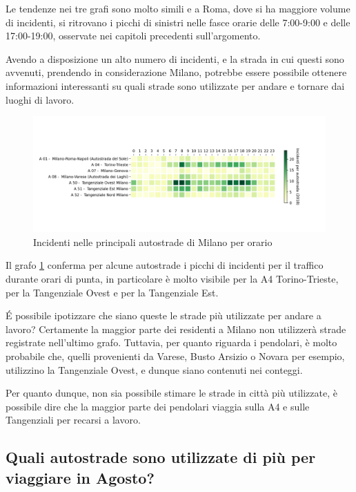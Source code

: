 \documentclass[a4paper]{report}
\begin{document}
Le tendenze nei tre grafi sono molto simili e a Roma, dove si ha maggiore 
volume di incidenti, si ritrovano i picchi di sinistri nelle fasce orarie delle 
7:00-9:00 e delle 17:00-19:00, osservate nei capitoli precedenti sull'argomento.


Avendo a disposizione un alto numero di incidenti, e la strada in cui questi sono 
avvenuti, prendendo in considerazione Milano, potrebbe essere possibile 
ottenere informazioni interessanti su quali strade sono utilizzate per 
andare e tornare dai luoghi di lavoro.

\begin{figure}
    \includegraphics[width=\linewidth]{../src/incidenti/incidenti_aci/orari/tangenziali_autostrade.png}
    \caption{Incidenti nelle principali autostrade di Milano per orario}
    \label{fig:tangenziali-autostrade}
\end{figure}

Il grafo \ref{fig:tangenziali-autostrade} conferma per alcune autostrade i picchi di 
incidenti per il traffico durante orari di punta, in particolare è molto visibile 
per la A4 Torino-Trieste, per la Tangenziale Ovest e per la Tangenziale Est.

\'E possibile ipotizzare che siano queste le strade più utilizzate per 
andare a lavoro? 
Certamente la maggior parte dei residenti a Milano non utilizzerà strade registrate 
nell'ultimo grafo. 
Tuttavia, per quanto riguarda i pendolari, è molto probabile che, quelli provenienti 
da Varese, Busto Arsizio o Novara per esempio, utilizzino la Tangenziale Ovest, 
e dunque siano contenuti nei conteggi. 

Per quanto dunque, non sia possibile stimare le strade in città più utilizzate, 
è possibile dire che la maggior parte dei pendolari viaggia sulla A4 e sulle 
Tangenziali per recarsi a lavoro.

\subsection{Quali autostrade sono utilizzate di più per viaggiare in Agosto?}
\end{document}
